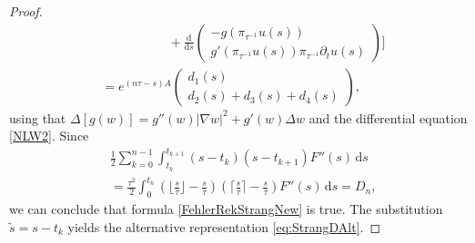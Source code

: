 \documentclass[10pt,a4paper]{amsart}
\newcommand{\dd}{\, \mathrm{d}}
\begin{document}
\begin{proof}
\begin{align*}
&\qquad \qquad \quad \  +\frac{\mathrm{d}}{\mathrm{d}s}\begin{pmatrix}-g(\pi_{\tau^{-1}} u(s)) \\ g'(\pi_{\tau^{-1}} u(s))\pi_{\tau^{-1}} \partial_t u(s)\end{pmatrix}\Bigg] \\
&= e^{(n\tau-s) A}\begin{pmatrix}d_1(s)\\d_2(s)+d_3(s)+d_4(s)\end{pmatrix}, 
\end{align*}
using that $\Delta[g(w)] = g''(w)|\nabla w|^2 + g'(w) \Delta w$ and the differential equation \eqref{NLW2}. Since 
\begin{align*}
&\frac12\sum_{k=0}^{n-1}\int_{t_k}^{t_{k+1}}(s-t_k)(s-t_{k+1})F''(s) \dd s \\
&= \tfrac{\tau^2}{2}\int_{0}^{t_n}(\lfloor\tfrac s\tau\rfloor-\tfrac s\tau)(\lceil\tfrac s\tau\rceil-\tfrac s\tau)F''(s) \dd s = D_n, 
\end{align*}
we can conclude that formula \eqref{FehlerRekStrangNew} is true. The substitution $\tilde s = s - t_k$ yields the alternative representation \eqref{eq:StrangDAlt}.
\end{proof}
\end{document}
